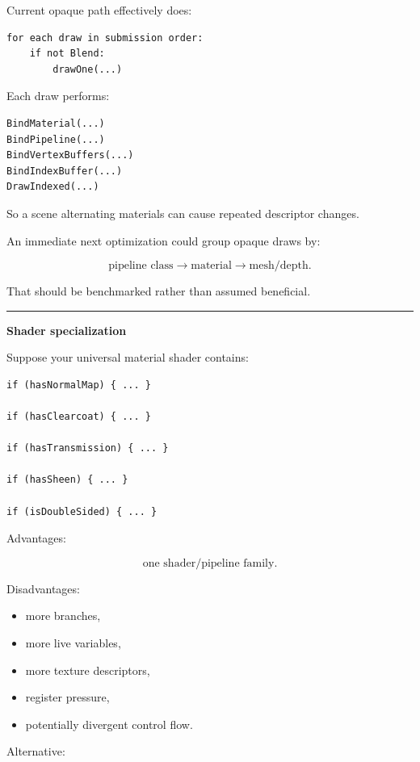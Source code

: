 Current opaque path effectively does:

\begin{verbatim}
for each draw in submission order:
    if not Blend:
        drawOne(...)
\end{verbatim}

Each draw performs:

\begin{verbatim}
BindMaterial(...)
BindPipeline(...)
BindVertexBuffers(...)
BindIndexBuffer(...)
DrawIndexed(...)
\end{verbatim}

So a scene alternating materials can cause repeated descriptor changes.

An immediate next optimization could group opaque draws by:

\[
\text{pipeline class}
\rightarrow
\text{material}
\rightarrow
\text{mesh/depth}.
\]

That should be benchmarked rather than assumed beneficial.

\begin{center}\rule{0.5\linewidth}{0.5pt}\end{center}

\textbf{Shader specialization}

Suppose your universal material shader contains:

\begin{verbatim}
if (hasNormalMap) { ... }

if (hasClearcoat) { ... }

if (hasTransmission) { ... }

if (hasSheen) { ... }

if (isDoubleSided) { ... }
\end{verbatim}

Advantages:

\[
\text{one shader/pipeline family}.
\]

Disadvantages:

\begin{itemize}
\tightlist
\item
  more branches,
\item
  more live variables,
\item
  more texture descriptors,
\item
  register pressure,
\item
  potentially divergent control flow.
\end{itemize}

Alternative:

